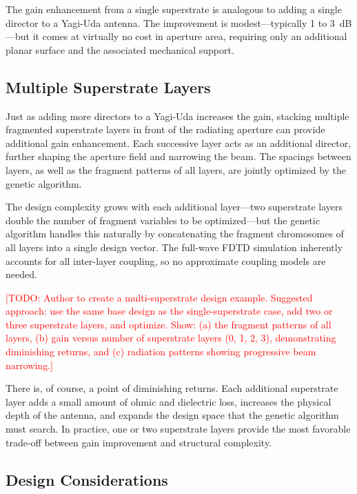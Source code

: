 The gain enhancement from a single superstrate is analogous to adding a single director to a Yagi-Uda antenna.  The improvement is modest---typically 1 to 3~dB---but it comes at virtually no cost in aperture area, requiring only an additional planar surface and the associated mechanical support.

\subsection{Multiple Superstrate Layers}

Just as adding more directors to a Yagi-Uda increases the gain, stacking multiple fragmented superstrate layers in front of the radiating aperture can provide additional gain enhancement.  Each successive layer acts as an additional director, further shaping the aperture field and narrowing the beam.  The spacings between layers, as well as the fragment patterns of all layers, are jointly optimized by the genetic algorithm.

The design complexity grows with each additional layer---two superstrate layers double the number of fragment variables to be optimized---but the genetic algorithm handles this naturally by concatenating the fragment chromosomes of all layers into a single design vector.  The full-wave FDTD simulation inherently accounts for all inter-layer coupling, so no approximate coupling models are needed.

\textcolor{red}{[TODO: Author to create a multi-superstrate design example.  Suggested approach: use the same base design as the single-superstrate case, add two or three superstrate layers, and optimize.  Show: (a) the fragment patterns of all layers, (b) gain versus number of superstrate layers (0, 1, 2, 3), demonstrating diminishing returns, and (c) radiation patterns showing progressive beam narrowing.]}

There is, of course, a point of diminishing returns.  Each additional superstrate layer adds a small amount of ohmic and dielectric loss, increases the physical depth of the antenna, and expands the design space that the genetic algorithm must search.  In practice, one or two superstrate layers provide the most favorable trade-off between gain improvement and structural complexity.

\subsection{Design Considerations}

